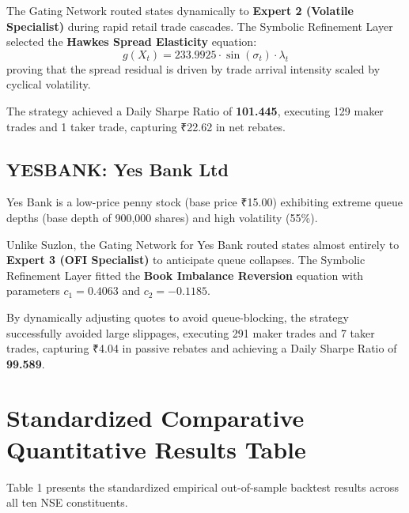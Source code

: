 \documentclass[11pt,a4paper]{article}
\begin{document}
The Gating Network routed states dynamically to \textbf{Expert 2 (Volatile Specialist)} during rapid retail trade cascades. The Symbolic Refinement Layer selected the \textbf{Hawkes Spread Elasticity} equation:
\begin{equation}
    g(X_t) = 233.9925 \cdot \sin(\sigma_t) \cdot \lambda_t
\end{equation}
proving that the spread residual is driven by trade arrival intensity scaled by cyclical volatility.

The strategy achieved a Daily Sharpe Ratio of \textbf{101.445}, executing 129 maker trades and 1 taker trade, capturing ₹22.62 in net rebates.

\subsection{YESBANK: Yes Bank Ltd}
Yes Bank is a low-price penny stock (base price ₹15.00) exhibiting extreme queue depths (base depth of 900,000 shares) and high volatility (55\%). 

Unlike Suzlon, the Gating Network for Yes Bank routed states almost entirely to \textbf{Expert 3 (OFI Specialist)} to anticipate queue collapses. The Symbolic Refinement Layer fitted the \textbf{Book Imbalance Reversion} equation with parameters $c_1 = 0.4063$ and $c_2 = -0.1185$.

By dynamically adjusting quotes to avoid queue-blocking, the strategy successfully avoided large slippages, executing 291 maker trades and 7 taker trades, capturing ₹4.04 in passive rebates and achieving a Daily Sharpe Ratio of \textbf{99.589}.

\section{Standardized Comparative Quantitative Results Table}
Table 1 presents the standardized empirical out-of-sample backtest results across all ten NSE constituents.
\end{document}
